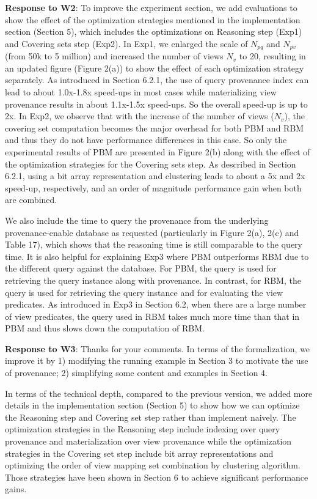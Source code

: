 \begin{appendix}
\textbf{Response to W2}:
To improve the experiment section, we add evaluations to show the effect of the optimization strategies mentioned in the implementation section (Section 5), which includes the optimizations on Reasoning step (Exp1) and Covering sets step (Exp2). In Exp1, we enlarged the scale of $N_{pq}$ and $N_{pv}$ (from 50k to 5 million) and increased the number of views $N_v$ to 20, resulting in an updated figure (Figure 2(a)) to show the effect of each optimization strategy separately. As introduced in Section 6.2.1, the use of query provenance index can lead to about 1.0x-1.8x speed-ups in most cases while materializing view provenance results in about 1.1x-1.5x speed-ups. So the overall speed-up is up to 2x. 
In Exp2, we observe that with the increase of the number of views ($N_v$), the covering set computation becomes the major overhead for both PBM and RBM and thus they do not have performance differences in this case. So only the experimental results of PBM are presented in Figure 2(b) along with the effect of the optimization strategies for the Covering sets step. As described in Section 6.2.1, using a bit array representation and clustering leads to about a 5x and 2x speed-up, respectively, and an order of magnitude performance gain when both are combined. 

We also include the time to query the provenance from the underlying provenance-enable database as requested (particularly in Figure 2(a), 2(c) and Table 17), which shows that the reasoning time is still comparable to the query time. It is also helpful for explaining Exp3 where PBM outperforms RBM due to the different query against the database. For PBM, the query is used for retrieving the query instance along with provenance. In contrast, for RBM, the query is used for retrieving the query instance and for evaluating the view predicates. As introduced in Exp3 in Section 6.2, when there are a large number of view predicates, the query used in RBM takes much more time than that in PBM and thus slows down the computation of RBM. 

\textbf{Response to W3}:
Thanks for your comments. 
In terms of the formalization, we improve it by 1) modifying the running example in Section 3 to motivate the use of provenance; 2) simplifying some content and examples in Section 4. 

In terms of the technical depth, compared to the previous version, we added more details in the implementation section (Section 5) to show how we can optimize the Reasoning step and Covering set step rather than implement naively. The optimization strategies in the Reasoning step include indexing over query provenance and materialization over view provenance while the optimization strategies in the Covering set step include bit array representations and optimizing the order of view mapping set combination by clustering algorithm. Those strategies have been shown in Section 6 to achieve significant performance gains.


\end{appendix}
